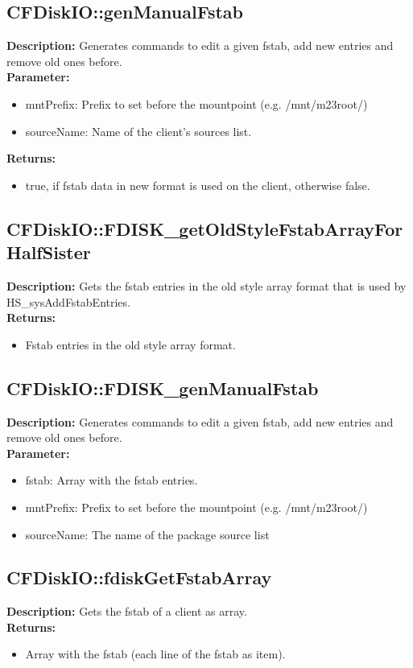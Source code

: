 \subsection{CFDiskIO::genManualFstab}
\textbf{Description:} Generates commands to edit a given fstab, add new entries and remove old ones before.\\
\textbf{Parameter:}
\begin{itemize}
\item mntPrefix: Prefix to set before the mountpoint (e.g. /mnt/m23root/)
\item sourceName: Name of the client's sources list.
\end{itemize}
\textbf{Returns:}
\begin{itemize}
\item true, if fstab data in new format is used on the client, otherwise false.
\end{itemize}

\subsection{CFDiskIO::FDISK\_getOldStyleFstabArrayForHalfSister}
\textbf{Description:} Gets the fstab entries in the old style array format that is used by HS\_sysAddFstabEntries.\\
\textbf{Returns:}
\begin{itemize}
\item Fstab entries in the old style array format.
\end{itemize}

\subsection{CFDiskIO::FDISK\_genManualFstab}
\textbf{Description:} Generates commands to edit a given fstab, add new entries and remove old ones before.\\
\textbf{Parameter:}
\begin{itemize}
\item fstab: Array with the fstab entries.
\item mntPrefix: Prefix to set before the mountpoint (e.g. /mnt/m23root/)
\item sourceName: The name of the package source list
\end{itemize}

\subsection{CFDiskIO::fdiskGetFstabArray}
\textbf{Description:} Gets the fstab of a client as array.\\
\textbf{Returns:}
\begin{itemize}
\item Array with the fstab (each line of the fstab as item).
\end{itemize}

